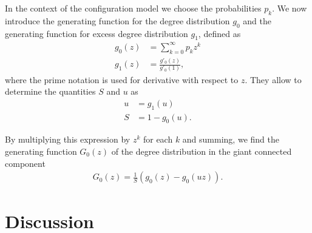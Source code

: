 \documentclass[a4paper]{article}
\begin{document}
In the context of the configuration model we choose the probabilities $p_k$. We now introduce the generating function for the degree distribution $g_0$ and the generating function for excess degree distribution $g_1$, defined as
\begin{align}
	g_0(z) &= \sum_{k=0}^\infty p_k z^k \\
	g_1(z) &= \frac{g'_0(z)}{g'_0(1)},
\end{align}
where the prime notation is used for derivative with respect to $z$. They allow to determine the quantities $S$ and $u$ as \missingref
\begin{align}
	u &= g_1(u) \\
	S &= 1 - g_0(u).
\end{align}

\begin{figure}
\end{figure}

By multiplying this expression by $z^k$ for each $k$ and summing, we find the generating function $G_0(z)$ of the degree distribution in the giant connected component
\begin{align}
	G_0(z) = \frac{1}{S} (g_0(z) - g_0(u z)).
\end{align}

\section{Discussion}
\end{document}
